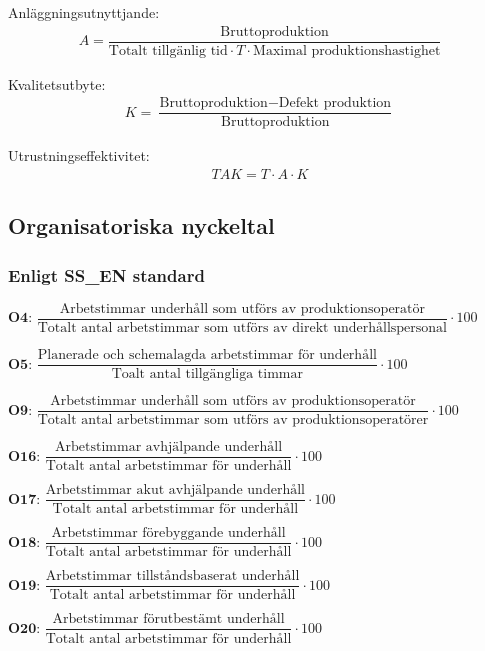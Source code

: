      Anläggningsutnyttjande:  
      \begin{align*}
			A = \dfrac{\text{Bruttoproduktion}}{\text{Totalt tillgänlig tid}\cdot T \cdot \text{Maximal produktionshastighet}}
      \end{align*}
				
      Kvalitetsutbyte:  
      \begin{align*}
			K = \dfrac{\text{Bruttoproduktion} -\text{Defekt produktion}}{\text{Bruttoproduktion}}
      \end{align*}
				
		 Utrustningseffektivitet:  
      \begin{align*}
			TAK = T \cdot A \cdot K
      \end{align*}
			
\subsection*{Organisatoriska nyckeltal}
		\subsubsection*{Enligt SS\_EN standard}
		$\textbf{O4: } \dfrac{\text{Arbetstimmar underhåll som utförs av produktionsoperatör}}{\text{Totalt antal arbetstimmar som utförs av direkt underhållspersonal}} \cdot 100$

		$\textbf{O5: } \dfrac{\text{Planerade och schemalagda arbetstimmar för underhåll}}{\text{Toalt antal tillgängliga timmar}} \cdot 100$
		
		$\textbf{O9: } \dfrac{\text{Arbetstimmar underhåll som utförs av produktionsoperatör}}{\text{Totalt antal arbetstimmar som utförs av produktionsoperatörer}} \cdot 100$
		
		$\textbf{O16: } \dfrac{\text{Arbetstimmar avhjälpande underhåll}}{\text{Totalt antal arbetstimmar för underhåll}} \cdot 100$
		
		$\textbf{O17: } \dfrac{\text{Arbetstimmar akut avhjälpande underhåll}}{\text{Totalt antal arbetstimmar för underhåll}} \cdot 100$
		
		$\textbf{O18: } \dfrac{\text{Arbetstimmar förebyggande underhåll}}{\text{Totalt antal arbetstimmar för underhåll}} \cdot 100$
		
		$\textbf{O19: } \dfrac{\text{Arbetstimmar tillståndsbaserat underhåll}}{\text{Totalt antal arbetstimmar för underhåll}} \cdot 100$
		
		$\textbf{O20: } \dfrac{\text{Arbetstimmar förutbestämt underhåll}}{\text{Totalt antal arbetstimmar för underhåll}} \cdot 100$

